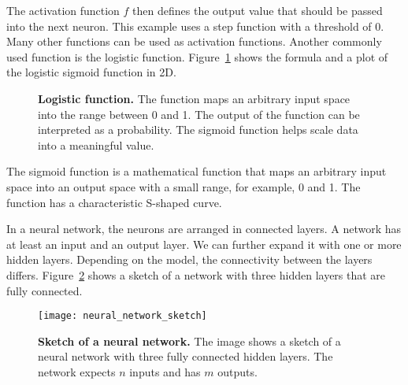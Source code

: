 The activation function $f$ then defines the output value that should be passed into the next neuron. This example uses a step function with a threshold of 0. Many other functions can be used as activation functions. Another commonly used function is the logistic function. Figure~\ref{fig:sigmoid} shows the formula and a plot of the logistic sigmoid function in 2D.
\begin{figure}[ht]
\centering
{}
\caption[Logistic function]{
 \textbf{Logistic function.}
 The function maps an arbitrary input space into the range between 0 and 1. The output of the function can be interpreted as a probability. The sigmoid function helps scale data into a meaningful value.
}
\label{fig:sigmoid}
\end{figure}
The sigmoid function is a mathematical function that maps an arbitrary input space into an output space with a small range, for example, 0 and 1. The function has a characteristic S-shaped curve.

In a neural network, the neurons are arranged in connected layers. A network has at least an input and an output layer. We can further expand it with one or more hidden layers. Depending on the model, the connectivity between the layers differs. Figure~\ref{fig:neural_network_sketch} shows a sketch of a network with three hidden layers that are fully connected.
\begin{figure}[ht]
\centering
\texttt{[image: neural\_network\_sketch]}
\caption[Sketch of a neural network]{
  \textbf{Sketch of a neural network.}
  The image shows a sketch of a neural network with three fully connected hidden layers. The network expects $n$ inputs and has $m$ outputs.
}
\label{fig:neural_network_sketch}
\end{figure}

